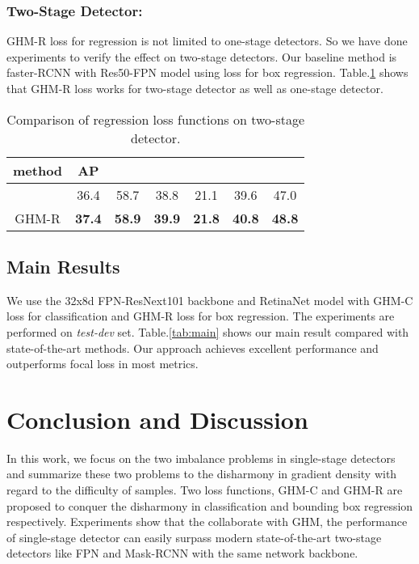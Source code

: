 \documentclass[letterpaper]{article} \usepackage{aaai19}  \usepackage{times}  \usepackage{helvet}  \usepackage{courier}  \usepackage{url}  \usepackage{graphicx}  \usepackage{amsmath,amssymb}
\begin{document}
\subsubsection{Two-Stage Detector:}  GHM-R loss for regression is not limited to one-stage detectors. So we have done experiments to verify the effect on two-stage detectors. Our baseline method is faster-RCNN with Res50-FPN model using  loss for box regression. Table.\ref{tab:reg2} shows that  GHM-R loss works for two-stage detector as well as one-stage detector.
\begin{table}[!ht]
\begin{center}
\begin{tabular}{| c | c  c  c  c  c  c |}
\hline
method & AP &  &  &  &  &  \\
\hline
 & 36.4 & 58.7 & 38.8 & 21.1 & 39.6 & 47.0 \\
GHM-R & \textbf{37.4} & \textbf{58.9} & \textbf{39.9} & \textbf{21.8} & \textbf{40.8} & \textbf{48.8} \\
\hline
\end{tabular}
\caption{Comparison of regression loss functions on two-stage detector.}
\label{tab:reg2}
\end{center}
\end{table}


\subsection{Main Results}
We use the 32x8d FPN-ResNext101 backbone and RetinaNet model with  GHM-C loss for classification and GHM-R loss for box regression. The experiments are performed on \textit{test-dev} set. Table.\ref{tab:main} shows our main result compared with state-of-the-art methods. Our approach achieves excellent performance and outperforms focal loss in most metrics.



\section{Conclusion and Discussion}
In this work, we focus on the two imbalance problems in single-stage detectors and summarize these two problems to the disharmony in gradient density with regard to the difficulty of samples. Two loss functions, GHM-C and GHM-R are proposed to conquer the disharmony in classification and bounding box regression respectively. Experiments show that the collaborate with GHM, the performance of single-stage detector can easily surpass modern state-of-the-art two-stage detectors like FPN and Mask-RCNN with the same network backbone.
\end{document}
